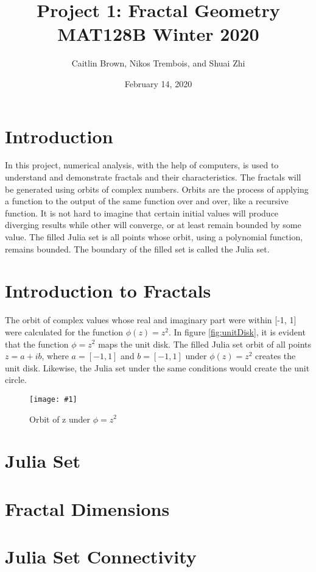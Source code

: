 \documentclass[letterpaper,11pt]{article}
\newcommand{\Figure}[3]{
\begin{figure}[h]
\begin{center}
\texttt{[image: \#1]}
\caption{#2}
\label{fig:#3}
\end{center}
\end{figure}
}
\begin{document}
\title{Project 1: Fractal Geometry \\ 
		\large MAT128B Winter 2020}
\author{Caitlin Brown, Nikos Trembois, and Shuai Zhi}
\date{February 14, 2020}
\maketitle
\tableofcontents
\newpage

\section{Introduction}
In this project, numerical analysis, with the help of computers, is used to understand and demonstrate fractals and their characteristics. The fractals will be generated using orbits of complex numbers. Orbits are the process of applying a function to the output of the same function over and over, like a recursive function. It is not hard to imagine that certain initial values will produce diverging results while other will converge, or at least remain bounded by some value. The filled Julia set is all points whose orbit, using a polynomial function, remains bounded. The boundary of the filled set is called the Julia set.

\section{Introduction to Fractals}
The orbit of complex values whose real and imaginary part were within [-1, 1] were calculated for the function $\phi(z) = z^2$. In figure \ref{fig:unitDisk}, it is evident that the function $\phi = z^2$ maps the unit disk. The filled Julia set orbit of all points $z = a + ib$, where $a = [-1,1]$ and $b = [-1,1]$ under $\phi(z) = z^2$ creates the unit disk. Likewise, the Julia set under the same conditions would create the unit circle. 

\Figure{../Figures/UnitDisk.png}{Orbit of z under $\phi=z^2$}{fig:unitDisk}

\section{Julia Set}

\section{Fractal Dimensions}

\section{Julia Set Connectivity}
\end{document}
